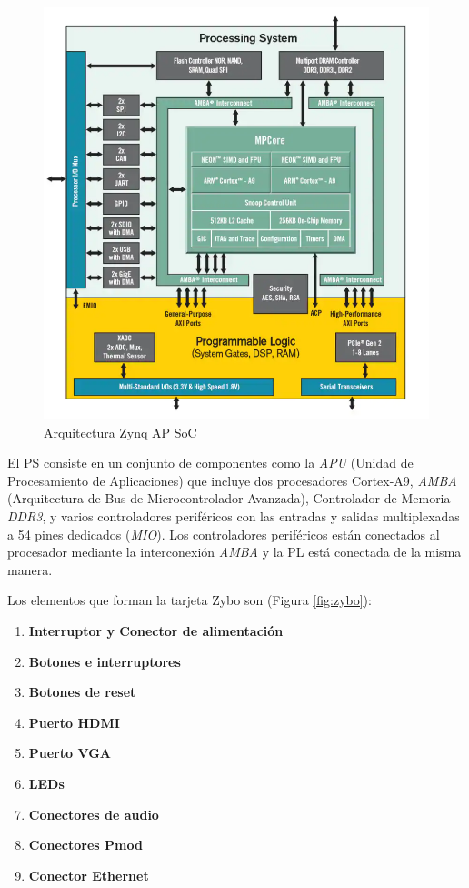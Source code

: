\begin{figure}[H]
    \centering
    \includegraphics[width = 1\textwidth]{imagenes/zynqapsoc.png}
    \caption{Arquitectura Zynq AP SoC}\label{fig:zynq}
\end{figure}

El PS consiste en un conjunto de componentes como la \textit{APU} (Unidad de Procesamiento de Aplicaciones) que incluye dos procesadores Cortex-A9, 
\textit{AMBA} (Arquitectura de Bus de Microcontrolador Avanzada), Controlador de Memoria \textit{DDR3}, y varios controladores periféricos con 
las entradas y salidas multiplexadas a 54 pines dedicados (\textit{MIO}). Los controladores periféricos están conectados al procesador mediante 
la interconexión \textit{AMBA} y la PL está conectada de la misma manera.

Los elementos que forman la tarjeta Zybo son (Figura \ref{fig:zybo}):
\begin{enumerate}
    \item \textbf{Interruptor y Conector de alimentación}
    \item \textbf{Botones e interruptores} 
    \item \textbf{Botones de reset} 
    \item \textbf{Puerto HDMI} 
    \item \textbf{Puerto VGA} 
    \item \textbf{LEDs} 
    \item \textbf{Conectores de audio} 
    \item \textbf{Conectores Pmod} 
    \item \textbf{Conector Ethernet}
\end{enumerate}

